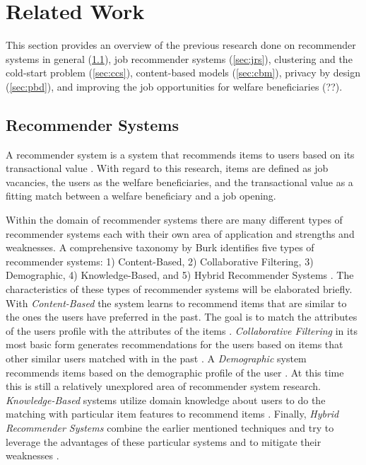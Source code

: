 \section{Related Work}
\label{sec:rel}


This section provides an overview of the previous research done on recommender systems in general (\ref{sec:rs}), job recommender systems (\ref{sec:jrs}), clustering and the cold-start problem (\ref{sec:ccs}), content-based models (\ref{sec:cbm}), privacy by design (\ref{sec:pbd}), and improving the job opportunities for welfare beneficiaries (??).%

\subsection{Recommender Systems}
\label{sec:rs}
A recommender system is a system that recommends items to users based on its transactional value \cite{aggarwal2016recommender}. With regard to this research, items are defined as job vacancies, the users as the welfare beneficiaries, and the transactional value as a fitting match between a welfare beneficiary and a job opening.

Within the domain of recommender systems there are many different types of recommender systems each with their own area of application and strengths and weaknesses.
A comprehensive taxonomy by Burk identifies five types of recommender systems: 1) Content-Based, 2) Collaborative Filtering, 3) Demographic, 4) Knowledge-Based, and 5) Hybrid Recommender Systems \cite{Burke2007HybridSystems}.
The characteristics of these types of recommender systems will be elaborated briefly.
With \textit{Content-Based} the system learns to recommend items that are similar to the ones the users have preferred in the past. 
The goal is to match the attributes of the users profile with the attributes of the items  \cite{aggarwal2016recommender}. 
\textit{Collaborative Filtering} in its most basic form generates recommendations for the users based on items that other similar users matched with in the past \cite{Schafer2007}.
A \textit{Demographic} system recommends items based on the demographic profile of the user \cite{Bobadilla2013RecommenderSurvey}.
At this time this is still a relatively unexplored area of recommender system research. \textit{Knowledge-Based} systems utilize domain knowledge about users to do the matching with particular item features to recommend items  \cite{aggarwal2016recommender}. 
Finally, \textit{Hybrid Recommender Systems} combine the earlier mentioned techniques and try to leverage the advantages of these particular systems and to mitigate their weaknesses  \cite{aggarwal2016recommender}.

